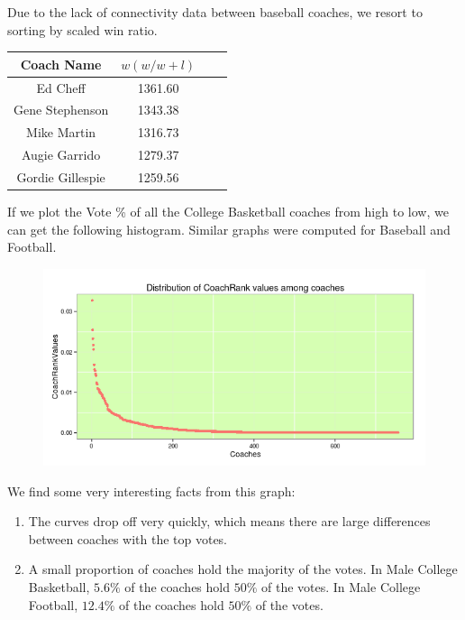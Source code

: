 \documentclass[11pt,notitlepage]{article}
\begin{document}
Due to the lack of connectivity data between baseball coaches, we resort to sorting by scaled win ratio.
\begin{center}
\begin{tabular}{ | c | c | c| c | }
\hline
Coach Name       & $w (w / w + l)$ \\\hline
Ed Cheff         & 1361.60 \\\hline
Gene Stephenson  & 1343.38 \\\hline
Mike Martin      & 1316.73 \\\hline
Augie Garrido    & 1279.37 \\\hline
Gordie Gillespie & 1259.56 \\
\hline
\end{tabular}
\end{center}

\noindent If we plot the Vote \% of all the College Basketball coaches from high to low, we can get the following histogram. Similar graphs were computed for Baseball and Football.

\begin{figure}[H]
      \centering
      \includegraphics[width=1\textwidth]{graphs/basketball_score_dist.png}
 \end{figure}

\noindent We find some very interesting facts from this graph:

\begin{enumerate}
\item The curves drop off very quickly, which means there are large differences between coaches with the top votes.
\item A small proportion of coaches hold the majority of the votes. In Male College Basketball, $5.6\%$ of the coaches hold $50\%$ of the votes. In Male College Football, $12.4\%$ of the coaches hold $50\%$ of the votes.
\end{enumerate}
\end{document}
